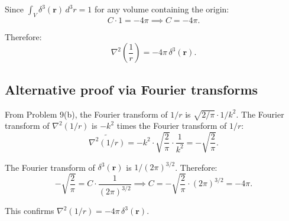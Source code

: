 \documentclass[12pt]{article}
\begin{document}
Since $\int_V \delta^3(\mathbf{r})\,d^3r = 1$ for any volume containing the origin:
\[
C \cdot 1 = -4\pi \implies C = -4\pi.
\]

Therefore:
\[
\boxed{\nabla^2\left(\frac{1}{r}\right) = -4\pi\,\delta^3(\mathbf{r}).}
\]

\subsection*{Alternative proof via Fourier transforms}

From Problem 9(b), the Fourier transform of $1/r$ is $\sqrt{2/\pi}\cdot 1/k^2$. The Fourier transform of $\nabla^2(1/r)$ is $-k^2$ times the Fourier transform of $1/r$:
\[
\widetilde{\nabla^2(1/r)} = -k^2\cdot\sqrt{\frac{2}{\pi}}\cdot\frac{1}{k^2} = -\sqrt{\frac{2}{\pi}}.
\]

The Fourier transform of $\delta^3(\mathbf{r})$ is $1/(2\pi)^{3/2}$. Therefore:
\[
-\sqrt{\frac{2}{\pi}} = C\cdot\frac{1}{(2\pi)^{3/2}} \implies C = -\sqrt{\frac{2}{\pi}}\cdot(2\pi)^{3/2} = -4\pi.
\]

This confirms $\nabla^2(1/r) = -4\pi\,\delta^3(\mathbf{r})$.
\end{document}
